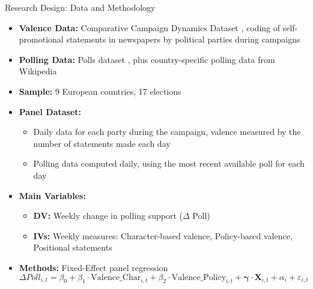 \documentclass[9pt, aspectratio=169]{beamer}
\newcommand{\customcite}[1]{\textcolor{blue}{\footnotesize\parencite{#1}}}
\begin{document}
\begin{frame}{Research Design: Data and Methodology}
    \begin{itemize}
        \item \textbf{Valence Data:} Comparative Campaign Dynamics Dataset \customcite{debussomer-topcu2018comparative}, coding of self-promotional statements in newspapers by political parties during campaigns \vspace{0.2cm}
        \item \textbf{Polling Data:} Polls dataset \customcite{Jennings2018}, plus country-specific polling data from Wikipedia \vspace{0.2cm}
        \item \textbf{Sample:} 9 European countries, 17 elections \vspace{0.2cm}
        \item \textbf{Panel Dataset:} 
        \begin{itemize}
            \item Daily data for each party during the campaign, valence measured by the number of statements made each day \vspace{0.2cm}
            \item Polling data computed daily, using the most recent available poll for each day
        \end{itemize} \vspace{0.2cm}
        \item \textbf{Main Variables:} 
        \begin{itemize}
            \item \textbf{DV:} Weekly change in polling support ($\Delta$ Poll) \vspace{0.2cm}
            \item \textbf{IVs:} Weekly measures: Character-based valence, Policy-based valence, Positional statements
        \end{itemize} \vspace{0.2cm}
        \item \textbf{Methods:} Fixed-Effect panel regression \vspace{0.2cm}
        \begin{equation*}
            \Delta Poll_{i,t} = \beta_0 + \beta_1 \cdot \text{Valence\_Char}_{i,t} + \beta_2 \cdot \text{Valence\_Policy}_{i,t} + \boldsymbol{\gamma} \cdot \mathbf{X}_{i,t} + \alpha_i + \varepsilon_{i,t}
        \end{equation*}
    \end{itemize}
\end{frame}
\end{document}
